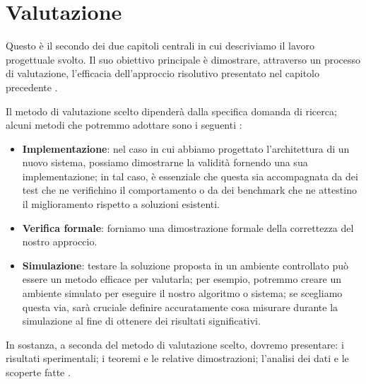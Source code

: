 \chapter{Valutazione}
\label{chap:valutazione}

\acresetall

Questo è il secondo dei due capitoli centrali in cui descriviamo il lavoro progettuale svolto. Il suo obiettivo principale è dimostrare, attraverso un processo di valutazione, l'efficacia dell'approccio risolutivo presentato nel capitolo precedente \cite{pfandzelter2022thesis}.

\medskip

Il metodo di valutazione scelto dipenderà dalla specifica domanda di ricerca; alcuni metodi che potremmo adottare sono i seguenti \cite{pfandzelter2022thesis}:
\begin{itemize}

\item \textbf{Implementazione}: nel caso in cui abbiamo progettato l'architettura di un nuovo sistema, possiamo dimostrarne la validità fornendo una sua implementazione; in tal caso, è essenziale che questa sia accompagnata da dei test che ne verifichino il comportamento o da dei benchmark che ne attestino il miglioramento rispetto a soluzioni esistenti.

\item \textbf{Verifica formale}: forniamo una dimostrazione formale della correttezza del nostro approccio.

\item \textbf{Simulazione}: testare la soluzione proposta in un ambiente controllato può essere un metodo efficace per valutarla; per esempio, potremmo creare un ambiente simulato per eseguire il nostro algoritmo o sistema; se scegliamo questa via, sarà cruciale definire accuratamente cosa misurare durante la simulazione al fine di ottenere dei risultati significativi.

\end{itemize}

In sostanza, a seconda del metodo di valutazione scelto, dovremo presentare: i risultati sperimentali; i teoremi e le relative dimostrazioni; l'analisi dei dati e le scoperte fatte  \cite{zobel2015writing}.

\medskip

